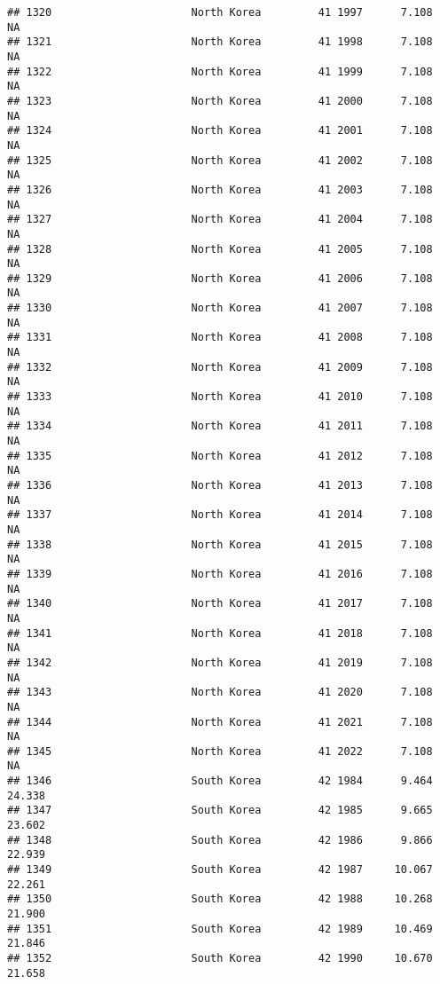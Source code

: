 \documentclass[
]{article}
\begin{document}
\begin{verbatim}
## 1320                      North Korea         41 1997      7.108         NA
## 1321                      North Korea         41 1998      7.108         NA
## 1322                      North Korea         41 1999      7.108         NA
## 1323                      North Korea         41 2000      7.108         NA
## 1324                      North Korea         41 2001      7.108         NA
## 1325                      North Korea         41 2002      7.108         NA
## 1326                      North Korea         41 2003      7.108         NA
## 1327                      North Korea         41 2004      7.108         NA
## 1328                      North Korea         41 2005      7.108         NA
## 1329                      North Korea         41 2006      7.108         NA
## 1330                      North Korea         41 2007      7.108         NA
## 1331                      North Korea         41 2008      7.108         NA
## 1332                      North Korea         41 2009      7.108         NA
## 1333                      North Korea         41 2010      7.108         NA
## 1334                      North Korea         41 2011      7.108         NA
## 1335                      North Korea         41 2012      7.108         NA
## 1336                      North Korea         41 2013      7.108         NA
## 1337                      North Korea         41 2014      7.108         NA
## 1338                      North Korea         41 2015      7.108         NA
## 1339                      North Korea         41 2016      7.108         NA
## 1340                      North Korea         41 2017      7.108         NA
## 1341                      North Korea         41 2018      7.108         NA
## 1342                      North Korea         41 2019      7.108         NA
## 1343                      North Korea         41 2020      7.108         NA
## 1344                      North Korea         41 2021      7.108         NA
## 1345                      North Korea         41 2022      7.108         NA
## 1346                      South Korea         42 1984      9.464     24.338
## 1347                      South Korea         42 1985      9.665     23.602
## 1348                      South Korea         42 1986      9.866     22.939
## 1349                      South Korea         42 1987     10.067     22.261
## 1350                      South Korea         42 1988     10.268     21.900
## 1351                      South Korea         42 1989     10.469     21.846
## 1352                      South Korea         42 1990     10.670     21.658

\end{verbatim}
\end{document}
